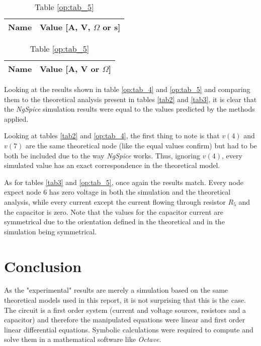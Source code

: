 \begin{table}
\parbox{.45\linewidth}{
\centering
                        

\centering                                  %
                        
\def\arraystretch{1}                       %
\begin{tabular}{c|c}                    %
\hline                                  %

\textbf{Name}  & \textbf{Value [A, V, $\Omega$ or s]}\\     

\hline                                %

\hline                                %
\end{tabular}

\caption{Table \ref{tab3}}
\label{tab9}
}
\hfill
\parbox{.45\linewidth}{
\centering

  \centering
  \def\arraystretch{1}
 
\begin{tabular}{c|c}
    \hline    
    \textbf{Name} & \textbf{Value [A, V or $\Omega$]} \\ \hline
    
    \hline
  \end{tabular}
  \captionsetup{justification=centering, margin=2cm}
  \caption{Table \ref{op:tab_5}}
  \label{tab10}
}
\end{table}
\FloatBarrier

Looking at the results shown in table \ref{op:tab_4} and \ref{op:tab_5} and comparing them to the theoretical analysis present in tables \ref{tab2} and \ref{tab3}, it is clear that the \emph{NgSpice} simulation results were equal to the values predicted by the methods applied.

Looking at tables \ref{tab2} and \ref{op:tab_4}, the first thing to note is that $v(4)$ and $v(7)$ are the same theoretical node (like the equal values confirm) but had to be both be included due to the way \emph{NgSpice} works. Thus, ignoring $v(4)$, every simulated value has an exact correspondence in the theoretical model.

As for tables \ref{tab3} and \ref{op:tab_5}, once again the results match. Every node expect node 6 has zero voltage in both the simulation and the theoretical analysis, while every current except the current flowing through resistor $R_5$ and the capacitor is zero. Note that the values for the capacitor current are symmetrical due to the orientation defined in the theoretical and in the simulation being symmetrical.

\section{Conclusion}
\label{sec:conclusion}
 As the "experimental" results are merely a simulation based on the same theoretical models used in this report, it is not surprising that this is the case. The circuit is a first order system (current and voltage sources, resistors and a capacitor) and therefore the manipulated equations were linear and first order linear differential equations. Symbolic calculations were required to compute and solve them in a mathematical software like \emph{Octave}. 
